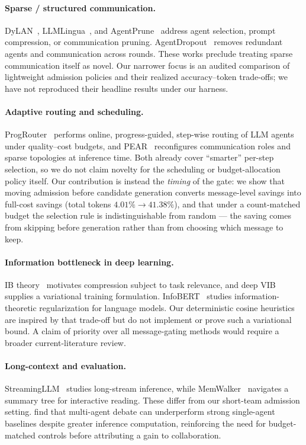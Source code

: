 \documentclass[11pt,twoside,twocolumn,letterpaper]{article}
\begin{document}
\paragraph{Sparse / structured communication.} DyLAN~\cite{liu2023dylan}, LLMLingua~\cite{jiang2023llmlingua}, and AgentPrune~\cite{zhang2024agentprune} address agent selection, prompt compression, or communication pruning. AgentDropout~\cite{wang2025agentdropout} removes redundant agents and communication across rounds. These works preclude treating sparse communication itself as novel. Our narrower focus is an audited comparison of lightweight admission policies and their realized accuracy--token trade-offs; we have not reproduced their headline results under our harness.

\paragraph{Adaptive routing and scheduling.} ProgRouter~\cite{li2026progrouter} performs online, progress-guided, step-wise routing of LLM agents under quality--cost budgets, and PEAR~\cite{feng2026pear} reconfigures communication roles and sparse topologies at inference time. Both already cover ``smarter'' per-step selection, so we do not claim novelty for the scheduling or budget-allocation policy itself. Our contribution is instead the \emph{timing} of the gate: we show that moving admission before candidate generation converts message-level savings into full-cost savings (total tokens $4.01\%\rightarrow41.38\%$), and that under a count-matched budget the selection rule is indistinguishable from random --- the saving comes from skipping before generation rather than from choosing which message to keep.

\paragraph{Information bottleneck in deep learning.} IB theory~\cite{tishby2015deep} motivates compression subject to task relevance, and deep VIB~\cite{alemi2017variational} supplies a variational training formulation. InfoBERT~\cite{wang2021infobert} studies information-theoretic regularization for language models. Our deterministic cosine heuristics are inspired by that trade-off but do not implement or prove such a variational bound. A claim of priority over all message-gating methods would require a broader current-literature review.

\paragraph{Long-context and evaluation.} StreamingLLM~\cite{xiao2023streamingllm} studies long-stream inference, while MemWalker~\cite{liu2024memwalker} navigates a summary tree for interactive reading. These differ from our short-team admission setting. \citet{zhang2025stopovervaluing} find that multi-agent debate can underperform strong single-agent baselines despite greater inference computation, reinforcing the need for budget-matched controls before attributing a gain to collaboration.
\end{document}
